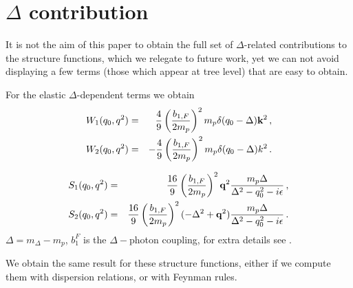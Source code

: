 \documentclass[a4paper,12pt]{article}
\newcommand{\bea}{\begin{eqnarray}}
\newcommand{\eea}{\end{eqnarray}}
\newcommand{\nn}{\nonumber}
\begin{document}
\appendix

\section{$\Delta$ contribution}

It is not the aim of this paper to obtain the full set of $\Delta$-related 
contributions to the structure functions, which we relegate to future 
work, yet we can not avoid displaying a few terms (those which appear at tree level)
that are easy to obtain.

For the elastic $\Delta$-dependent terms we obtain
\bea
W_1(q_0,q^2)&=&{4 \over 9} \left({b_{1,F} \over 2m_p}\right)^2
m_p\delta(q_0-\Delta){\bf k}^2
\,,
\nn
\\
W_2(q_0,q^2)&=&-{4 \over 9} \left({b_{1,F} \over 2m_p}\right)^2
m_p\delta(q_0-\Delta)k^2
\,.
\eea

\bea
S_1(q_0,q^2)&=&{16 \over 9} \left({b_{1,F} \over 2m_p}\right)^2
{\bf q}^2{m_p \Delta \over \Delta^2-q_0^2-i\epsilon} 
\,,
\nn
\\
S_2(q_0,q^2)&=&{16 \over 9} \left({b_{1,F} \over 2m_p}\right)^2
  (-\Delta^2+{\bf q}^2){ m_p \Delta\over \Delta^2-q_0^2-i\epsilon} 
\,.
\eea
$\Delta=m_{\Delta}-m_p$, $b_1^F$ is the 
$\Delta-$photon coupling, for extra details see \cite{Pineda:2002as}. 

We obtain the same result for these structure functions, either 
if we compute them with dispersion relations, or with Feynman 
rules.
\end{document}
